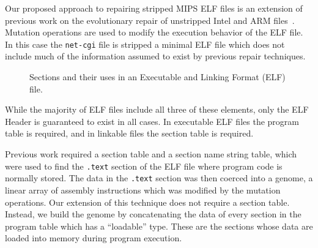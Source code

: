 \documentclass{sigcomm-alternate}
\begin{document}
Our proposed approach to repairing stripped MIPS ELF files is an extension
of previous work on the evolutionary repair of unstripped Intel and ARM
files~\cite{schulte2013embedded}. 
Mutation operations are used to modify the
execution behavior of the ELF file.  In this case the \texttt{net-cgi} file
is stripped a minimal ELF file which does not include much of the
information assumed to exist by previous repair techniques.

\begin{figure}[htb]
  \centering
{}
\caption{\label{elf}Sections and their uses in an Executable and
  Linking Format (ELF) file.}
\end{figure}

While the majority of ELF files include all three of these elements,
only the ELF Header is guaranteed to exist in all cases.  In
executable ELF files the program table is required, and in linkable
files the section table is required.

Previous work required a section table and a section
name string table, which were used to find the \texttt{.text} section of the
ELF file where program code is normally stored.  The data in the
\texttt{.text} section was then coerced into a genome, a linear array of
assembly instructions which was modified by the mutation operations.
Our extension of this technique does not require a section table.
Instead, we build the genome by concatenating the data of every section
in the program table which has a ``loadable'' type.  These are the
sections whose data are loaded into memory during program execution.
\end{document}
